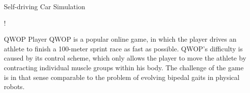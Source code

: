 \documentclass[a0paper,portrait]{baposter}
\begin{document}
\begin{poster}
\begin{posterbox}[name=car,column=1,below=props]{Self-driving Car Simulation}
	\begin{center}
		\resizebox {\columnwidth} {!} {
		}
	\end{center}
\end{posterbox}

\begin{posterbox}[name=qwop,column=2]{QWOP Player}
	QWOP is a popular online game, in which the player drives an athlete to finish a 100-meter sprint race as fast as possible. QWOP's difficulty is caused by its control scheme, which only allows the player to move the athlete by contracting individual muscle groups within his body. The challenge of the game is in that sense comparable to the problem of evolving bipedal gaits in physical robots.

	\vspace{0.5em}


\end{posterbox}
\end{poster}
\end{document}
